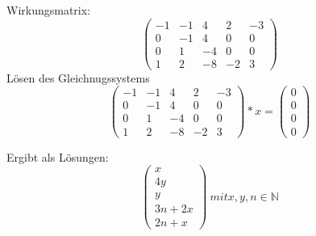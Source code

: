 Wirkungsmatrix:
\[
\begin{pmatrix}
-1&-1&4&2&-3\\
0&-1&4&0&0\\
0&1&-4&0&0\\
1&2&-8&-2&3
\end{pmatrix}
\]
Lösen des Gleichnugssystems
\[
\begin{pmatrix}
-1&-1&4&2&-3\\
0&-1&4&0&0\\
0&1&-4&0&0\\
1&2&-8&-2&3
\end{pmatrix}*x
=\begin{pmatrix}
0\\0\\0\\0
\end{pmatrix}
\]


Ergibt als Lösungen:
\[
\begin{pmatrix}
x\\
4y\\
y\\
3n+2x\\
2n+x
\end{pmatrix}\ mit x,y,n \in\mathbb{N}
\]
